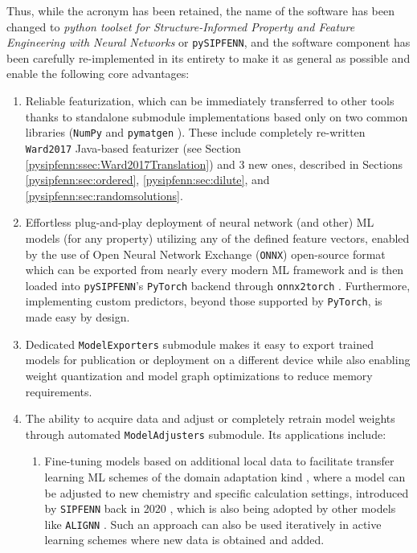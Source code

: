 Thus, while the acronym has been retained, the name of the software has been changed to \textit{python toolset for Structure-Informed Property and Feature Engineering with Neural Networks} or \texttt{pySIPFENN}, and the software component has been carefully re-implemented in its entirety to make it as general as possible and enable the following core advantages:

\begin{enumerate}
    
    \item Reliable featurization, which can be immediately transferred to other tools thanks to standalone submodule implementations based only on two common libraries (\texttt{NumPy} \cite{Harris2020ArrayNumPy} and \texttt{pymatgen} \cite{Ong2013PythonAnalysis}). These include completely re-written \texttt{Ward2017} Java-based featurizer \cite{Ward2017} (see Section \ref{pysipfenn:ssec:Ward2017Translation}) and 3 new ones, described in Sections \ref{pysipfenn:sec:ordered}, \ref{pysipfenn:sec:dilute}, and \ref{pysipfenn:sec:randomsolutions}.

    \item Effortless plug-and-play deployment of neural network (and other) ML models (for any property) utilizing any of the defined feature vectors, enabled by the use of Open Neural Network Exchange (\texttt{ONNX}) open-source format \cite{Bai2019ONNX:Exchange} which can be exported from nearly every modern ML framework and is then loaded into \texttt{pySIPFENN}'s \texttt{PyTorch} backend \cite{Paszke2019PyTorch:Library} through \texttt{onnx2torch} \cite{Kalgin2021Onnx2torch:PyTorch}. Furthermore, implementing custom predictors, beyond those supported by \texttt{PyTorch}, is made easy by design.

    \item Dedicated \texttt{ModelExporters} submodule makes it easy to export trained models for publication or deployment on a different device while also enabling weight quantization and model graph optimizations to reduce memory requirements.

    \item The ability to acquire data and adjust or completely retrain model weights through automated \texttt{ModelAdjusters} submodule. Its applications include:
    \begin{enumerate}
        \item Fine-tuning models based on additional local data to facilitate transfer learning ML schemes of the domain adaptation kind \cite{Ben-David2010ADomains}, where a model can be adjusted to new chemistry and specific calculation settings, introduced by \texttt{SIPFENN} back in 2020 \cite{Krajewski2022ExtensibleNetworks}, which is also being adopted by other models like \texttt{ALIGNN} \cite{Gupta2024Structure-awareDatasets}. Such an approach can also be used iteratively in active learning schemes where new data is obtained and added.
        

\end{enumerate}
\end{enumerate}
